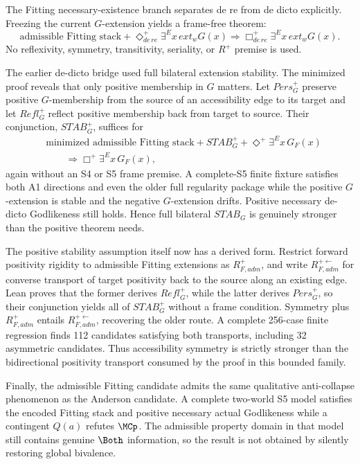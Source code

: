 The Fitting necessary-existence branch separates de re from de dicto explicitly. Freezing the current \(G\)-extension yields a frame-free theorem:
\[
  \text{admissible Fitting stack}
  +\Diamond_{de\,re}^+\exists^E x\,ext_wG(x)
  \Longrightarrow
  \Box_{de\,re}^+\exists^E x\,ext_wG(x).
\]
No reflexivity, symmetry, transitivity, seriality, or \(R^+\) premise is used.

The earlier de-dicto bridge used full bilateral extension stability. The minimized proof reveals that only positive membership in \(G\) matters. Let \(Pers_G^+\) preserve positive \(G\)-membership from the source of an accessibility edge to its target and let \(Refl_G^+\) reflect positive membership back from target to source. Their conjunction, \(STAB_G^+\), suffices for
\[
\begin{split}
  &\text{minimized admissible Fitting stack}
  +STAB_G^+
  +\Diamond^+\exists^E x\,G_F(x)\\
  &\qquad\Longrightarrow
  \Box^+\exists^E x\,G_F(x),
\end{split}
\]
again without an S4 or S5 frame premise. A complete-S5 finite fixture satisfies both A1 directions and even the older full regularity package while the positive \(G\)-extension is stable and the negative \(G\)-extension drifts. Positive necessary de-dicto Godlikeness still holds. Hence full bilateral \(STAB_G\) is genuinely stronger than the positive theorem needs.

The positive stability assumption itself now has a derived form. Restrict forward positivity rigidity to admissible Fitting extensions as \(R_{F,adm}^+\), and write \(R_{F,adm}^{+\leftarrow}\) for converse transport of target positivity back to the source along an existing edge. Lean proves that the former derives \(Refl_G^+\), while the latter derives \(Pers_G^+\), so their conjunction yields all of \(STAB_G^+\) without a frame condition. Symmetry plus \(R_{F,adm}^+\) entails \(R_{F,adm}^{+\leftarrow}\), recovering the older route. A complete 256-case finite regression finds 112 candidates satisfying both transports, including 32 asymmetric candidates. Thus accessibility symmetry is strictly stronger than the bidirectional positivity transport consumed by the proof in this bounded family.

Finally, the admissible Fitting candidate admits the same qualitative anti-collapse phenomenon as the Anderson candidate. A complete two-world S5 model satisfies the encoded Fitting stack and positive necessary actual Godlikeness while a contingent \(Q(a)\) refutes \(\MCp\). The admissible property domain in that model still contains genuine \(\Both\) information, so the result is not obtained by silently restoring global bivalence.

